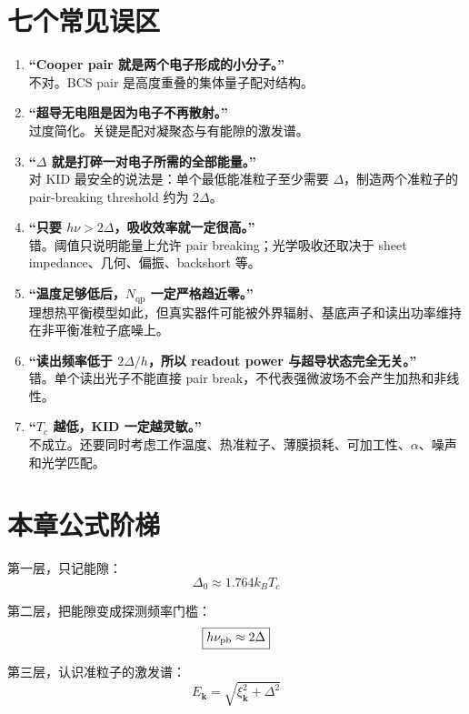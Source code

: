 \documentclass[11pt,a4paper,openany]{ctexrep}
\newcommand{\qp}{\mathrm{qp}}
\begin{document}
\section{七个常见误区}

\begin{mistakebox}
\begin{enumerate}
  \item \textbf{“Cooper pair 就是两个电子形成的小分子。”}\\
  不对。BCS pair 是高度重叠的集体量子配对结构。
  \item \textbf{“超导无电阻是因为电子不再散射。”}\\
  过度简化。关键是配对凝聚态与有能隙的激发谱。
  \item \textbf{“$\Delta$ 就是打碎一对电子所需的全部能量。”}\\
  对 KID 最安全的说法是：单个最低能准粒子至少需要 $\Delta$，制造两个准粒子的 pair-breaking threshold 约为 $2\Delta$。
  \item \textbf{“只要 $h\nu>2\Delta$，吸收效率就一定很高。”}\\
  错。阈值只说明能量上允许 pair breaking；光学吸收还取决于 sheet impedance、几何、偏振、backshort 等。
  \item \textbf{“温度足够低后，$N_{\qp}$ 一定严格趋近零。”}\\
  理想热平衡模型如此，但真实器件可能被外界辐射、基底声子和读出功率维持在非平衡准粒子底噪上。
  \item \textbf{“读出频率低于 $2\Delta/h$，所以 readout power 与超导状态完全无关。”}\\
  错。单个读出光子不能直接 pair break，不代表强微波场不会产生加热和非线性。
  \item \textbf{“$T_c$ 越低，KID 一定越灵敏。”}\\
  不成立。还要同时考虑工作温度、热准粒子、薄膜损耗、可加工性、$\alpha$、噪声和光学匹配。
\end{enumerate}
\end{mistakebox}

\section{本章公式阶梯}

第一层，只记能隙：
\[
\boxed{\Delta_0\approx1.764k_BT_c}
\]

第二层，把能隙变成探测频率门槛：
\[
\boxed{h\nu_{\rm pb}\approx2\Delta}
\]

第三层，认识准粒子的激发谱：
\[
\boxed{E_{\mathbf{k}}=\sqrt{\xi_{\mathbf{k}}^2+\Delta^2}}
\]
\end{document}
